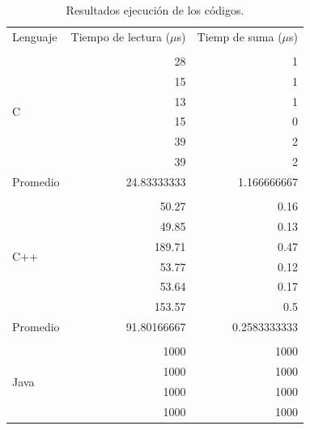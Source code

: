 \begin{table}[]
\centering
\caption{Resultados ejecución de los códigos.}
\label{chart}
\begin{tabular}{lrr}
Lenguaje                & Tiempo de lectura ($\mu$s) & Tiemp de suma ($\mu$s) \\
                        &                       &                   \\
\multirow{6}{*}{C}      & 28                    & 1                 \\
                        & 15                    & 1                 \\
                        & 13                    & 1                 \\
                        & 15                    & 0                 \\
                        & 39                    & 2                 \\
                        & 39                    & 2                 \\
Promedio                & 24.83333333           & 1.166666667       \\
                        &                       &                   \\
\multirow{6}{*}{C++}    & 50.27                 & 0.16              \\
                        & 49.85                 & 0.13              \\
                        & 189.71                & 0.47              \\
                        & 53.77                 & 0.12              \\
                        & 53.64                 & 0.17              \\
                        & 153.57                & 0.5               \\
Promedio                & 91.80166667           & 0.2583333333      \\
                        &                       &                   \\
\multirow{6}{*}{Java}   & 1000                  & 1000              \\
                        & 1000                  & 1000              \\
                        & 1000                  & 1000              \\
                        & 1000                  & 1000              \\

\end{tabular}
\end{table}
